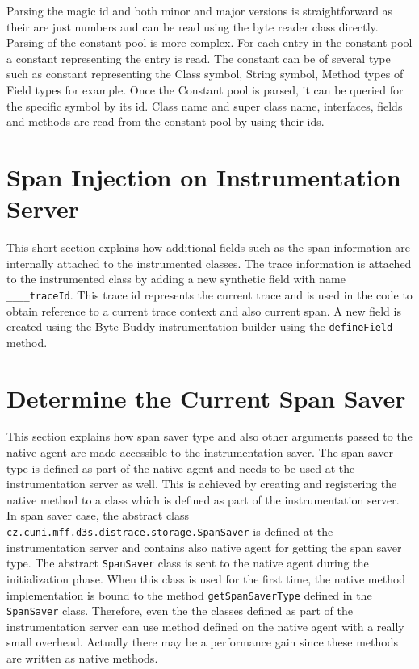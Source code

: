 Parsing the magic id and both minor and major versions is straightforward as their are just numbers and can be read using the byte reader class directly. Parsing of the constant pool is more complex. For each entry in the constant pool a constant representing the entry is read. The constant can be of several type such as constant representing the Class symbol, String symbol, Method types of Field types for example. Once the Constant pool is parsed, it can be queried for the specific symbol by its id. Class name and super class name, interfaces, fields and methods are read from the constant pool by using their ids.
\section{Span Injection on Instrumentation Server}
This short section explains how additional fields such as the span information are internally attached to the instrumented classes. The trace information is attached to the instrumented class by adding a new synthetic field with name \texttt{\_\_\_\_traceId}. This trace id represents the current trace and is used in the code to obtain reference to a current trace context and also current span.  A new field is created using the Byte Buddy instrumentation builder using the \texttt{defineField} method.
\section{Determine the Current Span Saver}
This section explains how span saver type and also other arguments passed to the native agent are made accessible to the instrumentation saver. The span saver type is defined as part of the native agent and needs to be used at the instrumentation server as well. This is achieved by creating and registering the native method to a class which is defined as part of the instrumentation server.
In span saver case, the abstract class \texttt{cz.cuni.mff.d3s.distrace.storage.SpanSaver} is defined at the instrumentation server and contains also native agent for getting the span saver type. The abstract \texttt{SpanSaver} class is sent to the native agent during the initialization phase. When this class is used for the first time, the native method implementation is bound to the method \texttt{getSpanSaverType} defined in the \texttt{SpanSaver} class. Therefore, even the the classes defined as part of the instrumentation server can use method defined on the native agent with a really small overhead. Actually there may be a performance gain since these methods are written as native methods.



